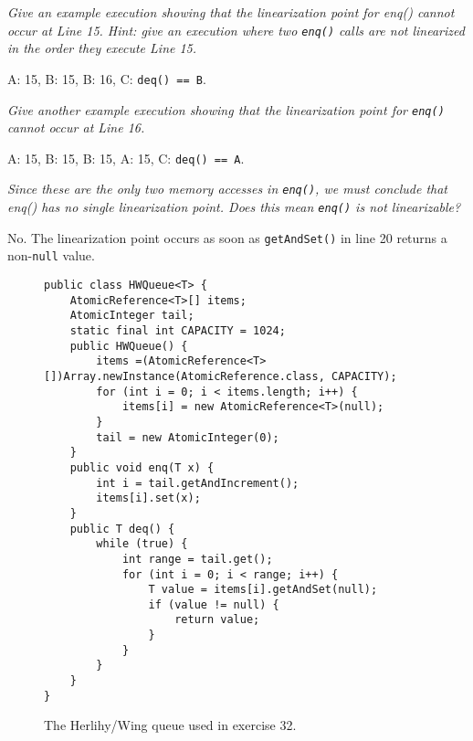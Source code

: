 \documentclass[a4paper,10pt]{article}
\begin{document}
\emph{Give an example execution showing that the linearization point for enq()
cannot occur at Line 15. Hint: give an execution where two \lstinline|enq()|
calls are not linearized in the order they execute Line 15.}

\vspace{3mm}

A: 15, B: 15, B: 16, C: \lstinline|deq() == B|.

\vspace{3mm}

\emph{Give another example execution showing that the linearization point for \lstinline|enq()|
cannot occur at Line 16.}

\vspace{3mm}

A: 15, B: 15, B: 15, A: 15, C: \lstinline|deq() == A|.

\vspace{3mm}

\emph{Since these are the only two memory accesses in \lstinline|enq()|, we must conclude that
enq() has no single linearization point. Does this mean \lstinline|enq()| is not linearizable?}

\vspace{3mm}

No. The linearization point occurs as soon as \lstinline|getAndSet()| in line 20
returns a non-\lstinline|null| value.

\begin{figure}
\begin{lstlisting}
public class HWQueue<T> {
    AtomicReference<T>[] items;
    AtomicInteger tail;
    static final int CAPACITY = 1024;
    public HWQueue() {
        items =(AtomicReference<T>[])Array.newInstance(AtomicReference.class, CAPACITY);
        for (int i = 0; i < items.length; i++) {
            items[i] = new AtomicReference<T>(null);
        }
        tail = new AtomicInteger(0);
    }
    public void enq(T x) {
        int i = tail.getAndIncrement();
        items[i].set(x);
    }
    public T deq() {
        while (true) {
            int range = tail.get();
            for (int i = 0; i < range; i++) {
                T value = items[i].getAndSet(null);
                if (value != null) {
                    return value;
                }
            }
        }
    }
}
\end{lstlisting}
\caption{The Herlihy/Wing queue used in exercise 32.}
\label{fig:nonlinearizablequeue}
\end{figure}
\end{document}
